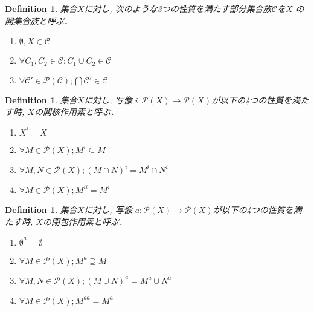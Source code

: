 \documentclass[lualatex]{ltjsbook}
\newtheorem{definition}[theorem]{Definition}
\theoremstyle{remark}
\theoremstyle{plain}
\begin{document}
\begin{definition}
	集合$X$に対し,  次のような3つの性質を満たす部分集合族$\mathcal{C}$を$X$ の開集合族と呼ぶ．
	\begin{enumerate}
		\item $\emptyset , X \in \mathcal{C}$ 
		\item $\forall C_1 ,  C_2 \in  \mathcal{C}; C_1 \cup C_2 \in \mathcal{C}$ 
		\item $\forall \mathcal{C}' \in \mathcal{P}(\mathcal{C}); \bigcap \mathcal{C}' \in \mathcal{C} $

	\end{enumerate}
\end{definition}

\begin{definition}
	集合$X$に対し,  写像 $i: \mathcal{P}(X) \to \mathcal{P}(X)$が以下の4つの性質を満たす時,   $X$の開核作用素と呼ぶ．
	 \begin{enumerate}
		\item $X^{i}=X$
		\item $\forall M \in \mathcal{P}(X); M^{i}\subseteq M$
		\item $\forall M , N \in \mathcal{P}(X); \left( M \cap N \right) ^{i} = M^{i} \cap N^{i}$
		\item $\forall M \in \mathcal{P}(X); M^{ii}= M^{i}$
	\end{enumerate}
\end{definition}

\begin{definition}
  \label{def:cl-op}
  集合$X$に対し,  写像 $a: \mathcal{P}(X) \to \mathcal{P}(X)$が以下の4つの性質を満たす時,   $X$の閉包作用素と呼ぶ．
	 \begin{enumerate}
		\item $\emptyset^{a}=\emptyset$
		\item $\forall M \in \mathcal{P}(X); M^{a}\supseteq M$
		\item $\forall M , N \in \mathcal{P}(X); \left( M \cup N \right) ^{a} = M^{a} \cup N^{a}$
		\item $\forall M \in \mathcal{P}(X); M^{aa}= M^{a}$
	\end{enumerate}

\end{definition}
\end{document}

